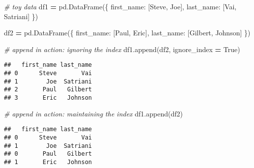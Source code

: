 \documentclass[
]{book}
\newenvironment{Shaded}{\begin{snugshade}}{\end{snugshade}}
\newcommand{\CommentTok}[1]{\textcolor[rgb]{0.56,0.35,0.01}{\textit{#1}}}
\newcommand{\NormalTok}[1]{#1}
\newcommand{\OperatorTok}[1]{\textcolor[rgb]{0.81,0.36,0.00}{\textbf{#1}}}
\newcommand{\StringTok}[1]{\textcolor[rgb]{0.31,0.60,0.02}{#1}}
\newcommand{\VariableTok}[1]{\textcolor[rgb]{0.00,0.00,0.00}{#1}}
\begin{document}
\begin{Shaded}
\begin{Highlighting}[]
\CommentTok{\# toy data}
\NormalTok{df1 }\OperatorTok{=}\NormalTok{ pd.DataFrame(\{}
    \StringTok{\textquotesingle{}first\_name\textquotesingle{}}\NormalTok{: [}\StringTok{\textquotesingle{}Steve\textquotesingle{}}\NormalTok{, }\StringTok{\textquotesingle{}Joe\textquotesingle{}}\NormalTok{],}
    \StringTok{\textquotesingle{}last\_name\textquotesingle{}}\NormalTok{: [}\StringTok{\textquotesingle{}Vai\textquotesingle{}}\NormalTok{, }\StringTok{\textquotesingle{}Satriani\textquotesingle{}}\NormalTok{]}
\NormalTok{\})}

\NormalTok{df2 }\OperatorTok{=}\NormalTok{ pd.DataFrame(\{}
    \StringTok{\textquotesingle{}first\_name\textquotesingle{}}\NormalTok{: [}\StringTok{\textquotesingle{}Paul\textquotesingle{}}\NormalTok{, }\StringTok{\textquotesingle{}Eric\textquotesingle{}}\NormalTok{],}
    \StringTok{\textquotesingle{}last\_name\textquotesingle{}}\NormalTok{: [}\StringTok{\textquotesingle{}Gilbert\textquotesingle{}}\NormalTok{, }\StringTok{\textquotesingle{}Johnson\textquotesingle{}}\NormalTok{]}
\NormalTok{\})}
\end{Highlighting}
\end{Shaded}

\begin{Shaded}
\begin{Highlighting}[]
\CommentTok{\# append in action: ignoring the index}
\NormalTok{df1.append(df2, ignore\_index }\OperatorTok{=} \VariableTok{True}\NormalTok{)}
\end{Highlighting}
\end{Shaded}

\begin{verbatim}
##   first_name last_name
## 0      Steve       Vai
## 1        Joe  Satriani
## 2       Paul   Gilbert
## 3       Eric   Johnson
\end{verbatim}

\begin{Shaded}
\begin{Highlighting}[]
\CommentTok{\# append in action: maintaining the index}
\NormalTok{df1.append(df2)}
\end{Highlighting}
\end{Shaded}

\begin{verbatim}
##   first_name last_name
## 0      Steve       Vai
## 1        Joe  Satriani
## 0       Paul   Gilbert
## 1       Eric   Johnson
\end{verbatim}
\end{document}
